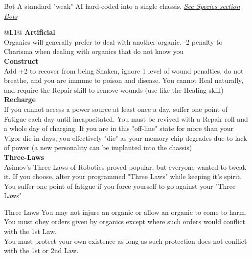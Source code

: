 \begin{genericsection}{Bot}
  A standard "weak" AI hard-coded into a single chassis. \textit{\hyperref[sec:specie-bots]{See Species section Bots}}
\end{genericsection}
\begin{redtable}{\linewidth}{@{}L{1}@{}}
  \textbf{Artificial}\\
  Organics will generally prefer to deal with another organic. -2 penalty to Charisma when dealing with organics that do not know you\\
  \textbf{Construct}\\
  Add +2 to recover from being Shaken, ignore 1 level of wound penalties, do not breathe, and you are immune to poison and disease. You cannot Heal naturally, and require the Repair skill to remove wounds (use like the Healing skill)\\
  \textbf{Recharge}\\
  If you cannot access a power source at least once a day, suffer one point of Fatigue each day until incapacitated. You must be revived with a Repair roll and a whole day of charging. If you are in this "off-line" state for more than your Vigor die in days, you effectively "die" as your memory chip degrades due to lack of power (a new personality can be implanted into the chassis)\\
  \textbf{Three-Laws}\\
  Asimov's Three Laws of Robotics proved popular, but everyone wanted to tweak it. If you choose, alter your programmed "Three Laws" while keeping it's spirit. You suffer one point of fatigue if you force yourself to go against your "Three Laws"
\end{redtable}

\begin{commentbox}{Three Laws}
You may not injure an organic or allow an organic to come to harm.\\
You must obey orders given by organics except where such orders would conflict with the 1st Law.\\
You must protect your own existence as long as such protection does not conflict with the 1st or 2nd Law.
\end{commentbox}
  
